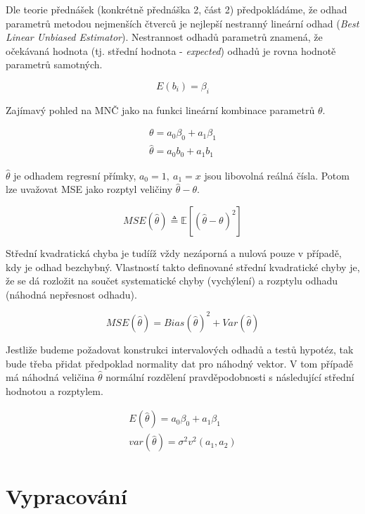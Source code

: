 Dle teorie přednášek (konkrétně přednáška 2, část 2) předpokládáme, že odhad parametrů metodou nejmenších čtverců je nejlepší nestranný lineární odhad (\textit{Best Linear Unbiased Estimator}).
Nestrannost odhadů parametrů znamená, že očekávaná hodnota (tj. střední hodnota - \textit{expected}) odhadů je rovna hodnotě parametrů samotných.

\begin{equation}
    E(b_i) = \beta_i
\end{equation}

Zajímavý pohled na MNČ jako na funkci lineární kombinace parametrů \( \theta \).

\begin{align}
    \theta = a_0 \beta_0 + a_1 \beta_1 \\
    \hat{\theta} = a_0 b_0 + a_1 b_1
\end{align}

\( \hat{\theta} \) je odhadem regresní přímky, \( a_0 = 1, \: a_1 = x\) jsou libovolná reálná čísla.
Potom lze uvažovat MSE jako rozptyl veličiny \( \hat{\theta} - \theta \).

\begin{equation}
    {MSE}(\hat{\theta}) \triangleq \mathbb{E} \left[( \hat{\theta} - \theta)^{2}\right]
\end{equation}

Střední kvadratická chyba je tudííž vždy nezáporná a nulová pouze v případě, kdy je odhad bezchybný.
Vlastností takto definované střední kvadratické chyby je, že se dá rozložit na součet systematické chyby (vychýlení) a rozptylu odhadu (náhodná nepřesnost odhadu).

\begin{equation}
    {MSE}(\hat{\theta}) = {Bias}(\hat{\theta})^{2} + {Var}(\hat{\theta})
\end{equation}

Jestliže budeme požadovat konstrukci intervalových odhadů a testů hypotéz, tak bude třeba přidat předpoklad normality dat pro náhodný vektor.
V tom případě má náhodná veličina \( \hat{\theta} \) normální rozdělení pravděpodobnosti s následující střední hodnotou a rozptylem.

\begin{align}
    E(\hat{\theta}) = a_0 \beta_0 + a_1 \beta_1 \\
    var(\hat{\theta}) = \sigma^2 v^2(a_1, a_2)
\end{align}

\section{Vypracování}

